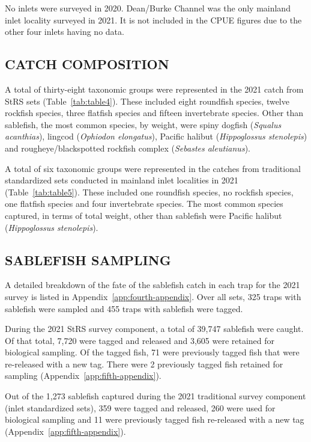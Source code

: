 \documentclass[12pt]{article}\usepackage[]{graphicx}\usepackage[]{color}
\begin{document}
No inlets were surveyed in 2020. Dean/Burke Channel was the only mainland inlet locality surveyed in 2021. It is not included in the CPUE figures due to the other four inlets having no data.

\hypertarget{catch-composition}{%
\subsection{CATCH COMPOSITION}\label{catch-composition}}

A total of thirty-eight taxonomic groups were represented in the 2021 catch from StRS sets (Table~\ref{tab:table4}). These included eight roundfish species, twelve rockfish species, three flatfish species and fifteen invertebrate species. Other than sablefish, the most common species, by weight, were spiny dogfish (\emph{Squalus acanthias}), lingcod (\emph{Ophiodon elongatus}), Pacific halibut (\emph{Hippoglossus stenolepis}) and rougheye/blackspotted rockfish complex (\emph{Sebastes aleutianus}).

A total of six taxonomic groups were represented in the catches from traditional standardized sets conducted in mainland inlet localities in 2021 (Table~\ref{tab:table5}). These included one roundfish species, no rockfish species, one flatfish species and four invertebrate species. The most common species captured, in terms of total weight, other than sablefish were Pacific halibut (\emph{Hippoglossus stenolepis}).

\hypertarget{sablefish-sampling}{%
\subsection{SABLEFISH SAMPLING}\label{sablefish-sampling}}

A detailed breakdown of the fate of the sablefish catch in each trap for the 2021 survey is listed in Appendix~\ref{app:fourth-appendix}. Over all sets, 325 traps with sablefish were sampled and 455 traps with sablefish were tagged.

During the 2021 StRS survey component, a total of 39,747 sablefish were caught. Of that total, 7,720 were tagged and released and 3,605 were retained for biological sampling. Of the tagged fish, 71 were previously tagged fish that were re-released with a new tag. There were 2 previously tagged fish retained for sampling (Appendix~\ref{app:fifth-appendix}).

Out of the 1,273 sablefish captured during the 2021 traditional survey component (inlet standardized sets), 359 were tagged and released, 260 were used for biological sampling and 11 were previously tagged fish re-released with a new tag (Appendix~\ref{app:fifth-appendix}).
\end{document}
